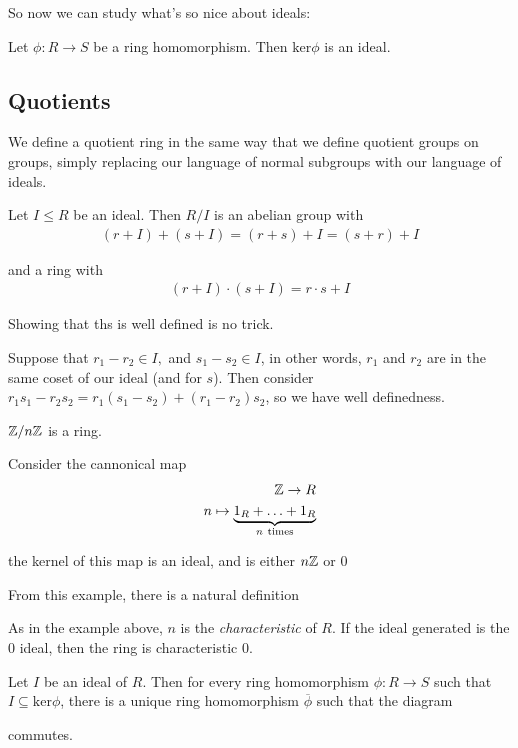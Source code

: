 \documentclass[12pt, twosided]{article}
\begin{document}
So now we can study what's so nice about ideals:

\begin{thm}
  Let \(\phi: R \to S\) be a ring homomorphism. Then \(\mathrm{ker} \phi\) is an ideal.
\end{thm}

\subsection{Quotients}

We define a quotient ring in the same way that we define quotient groups on groups, simply replacing our language of normal subgroups with our language of ideals.

\begin{df}
  Let \(I \leq R\) be an ideal. Then \(R / I\) is an abelian group with
  \begin{align*}
    (r + I) + (s + I) = (r + s) + I = (s + r) + I
  \end{align*}

  and a ring with
  \begin{align*}
    (r + I) \cdot (s + I) = r \cdot s + I
  \end{align*}
\end{df}

Showing that ths is well defined is no trick.

Suppose that \(r_1 - r_2 \in I,\) and \(s_1 - s_2 \in I\), in other words, \(r_1\) and \(r_2\) are in the same coset of our ideal (and for \(s\)). Then consider \(r_1s_1 - r_2s_2 = r_1(s_1 - s_2) + (r_1 - r_2)s_2\), so we have well definedness.

\begin{exa}
  \(\mathbb{Z} / n\mathbb{Z}\) is a ring.

  Consider the cannonical map
  \begin{align*}
    \mathbb{Z} \to R \\
    n \mapsto \underbrace{1_R + \ldots + 1_R}_{n\ \mathrm{times}}
  \end{align*}

  the kernel of this map is an ideal, and is either \(n\mathbb{Z}\) or 0
\end{exa}
From this example, there is a natural definition
\begin{df}
  As in the example above, \(n\) is the \textit{characteristic} of \(R\). If the ideal generated is the 0 ideal, then the ring is characteristic 0.
\end{df}

\begin{thm}
  Let \(I\) be an ideal of \(R\). Then for every ring homomorphism \(\phi: R \to S\) such that \(I \subseteq \mathrm{ker}\phi\), there is a unique ring homomorphism \(\overline{\phi}\) such that the diagram

  \begin{center}
  \end{center}
  commutes.
\end{thm}
\end{document}
